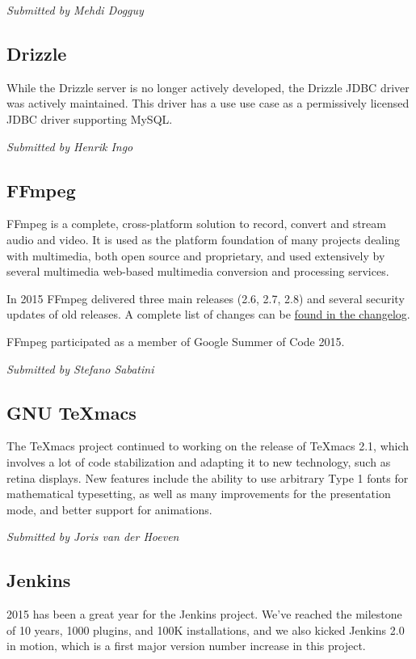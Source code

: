 \documentclass[letterpaper]{report}
\begin{document}
{\em Submitted by Mehdi Dogguy}

\subsection{Drizzle}

While the Drizzle server is no longer actively developed, the Drizzle JDBC
driver was actively maintained.  This driver has a use use case as a
permissively licensed JDBC driver supporting MySQL.

{\em Submitted by Henrik Ingo}

\subsection{FFmpeg}

FFmpeg is a complete, cross-platform solution to record, convert and
stream audio and video. It is used as the platform foundation of many
projects dealing with multimedia, both open source and proprietary, and
used extensively by several multimedia web-based multimedia conversion and
processing services.

In 2015 FFmpeg delivered three main releases (2.6, 2.7, 2.8) and several
security updates of old releases. A complete list of changes can be
\href{http://git.videolan.org/?p=ffmpeg.git;a=blob_plain;f=Changelog;hb=HEAD}{found
in the changelog}.

FFmpeg participated as a member of Google Summer of Code 2015.

{\em Submitted by Stefano Sabatini}

\subsection{GNU TeXmacs}

The TeXmacs project continued to working on the release of TeXmacs 2.1,
which involves a lot of code stabilization and adapting it to new
technology, such as retina displays.  New features include the ability to
use arbitrary Type 1 fonts for mathematical typesetting, as well as many
improvements for the presentation mode, and better support for animations.

{\em Submitted by Joris van der Hoeven}

\subsection{Jenkins}

2015 has been a great year for the Jenkins project. We've reached the
milestone of 10 years, 1000 plugins, and 100K installations, and we also
kicked Jenkins 2.0 in motion, which is a first major version number
increase in this project.
\end{document}

